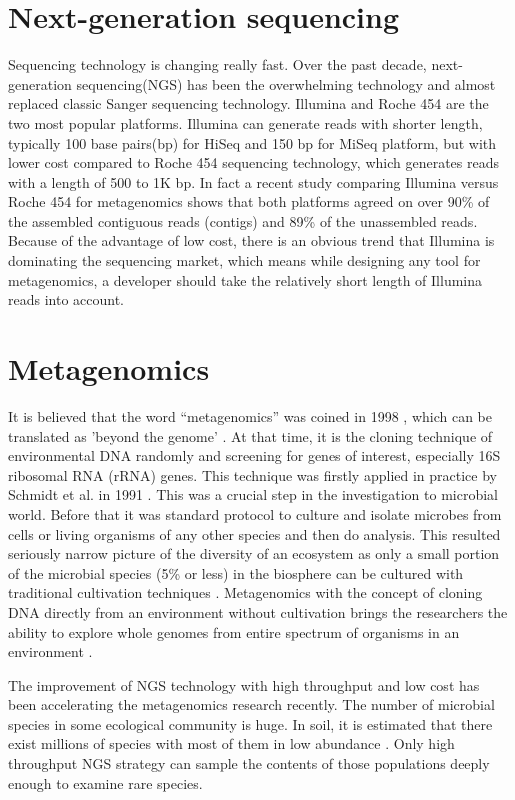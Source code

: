 \section{Next-generation sequencing}
Sequencing technology is changing really fast. Over the past decade, next-generation sequencing(NGS)
 has been the overwhelming technology and almost replaced classic Sanger sequencing technology. 
 Illumina and Roche 454 are the two most popular platforms. Illumina can generate reads with shorter
 length, typically 100 base pairs(bp) for HiSeq and 150 bp for MiSeq platform\cite{Qin:2010aa, Mason:2012aa},   
 but with lower cost compared to Roche 454 sequencing technology, 
 which generates reads with a length of 500 to 1K bp. In fact a recent study comparing Illumina versus Roche 454 for metagenomics
 shows that both platforms agreed on over 90\% of the assembled contiguous reads (contigs) and 89\% of the unassembled reads\cite{Luo:2012aa}.
Because of the advantage of low cost, there is an obvious trend that Illumina is dominating the sequencing market, which 
means while designing any tool for metagenomics, a developer should take the relatively short length of Illumina reads
 into account.


\section{Metagenomics}
It is believed that the word ``metagenomics'' was coined in 1998 \cite{Handelsman:1998aa},
 which can be translated as 'beyond the genome' \cite{Gilbert:2011aa}. At that time, 
 it is the cloning technique of environmental DNA randomly and screening for genes of interest, 
 especially 16S ribosomal RNA (rRNA) genes. This technique was firstly applied in practice by Schmidt et al. in 1991 \cite{Schmidt:1991aa}.
 This was a crucial step in the investigation to microbial world. Before that it was standard 
 protocol to culture and isolate microbes from cells or living organisms of any other species and 
 then do analysis. This resulted seriously narrow picture of the diversity of an ecosystem as only a
 small portion of the microbial species (5\% or less) in the biosphere can be cultured with traditional cultivation techniques \cite{Sogin:2006aa}.
 Metagenomics with the concept of cloning DNA directly from an environment without cultivation 
 brings the researchers the ability to explore whole genomes from entire spectrum of organisms in an environment
.
 
The improvement of NGS technology with high throughput and low cost has been accelerating
the metagenomics research recently. The number of microbial species in some ecological community is huge. 
In soil, it is estimated that there exist millions of species with most of them in low abundance \cite{Gans:2005aa}. 
Only high throughput NGS strategy can sample the contents of those populations deeply enough
to examine rare species.

